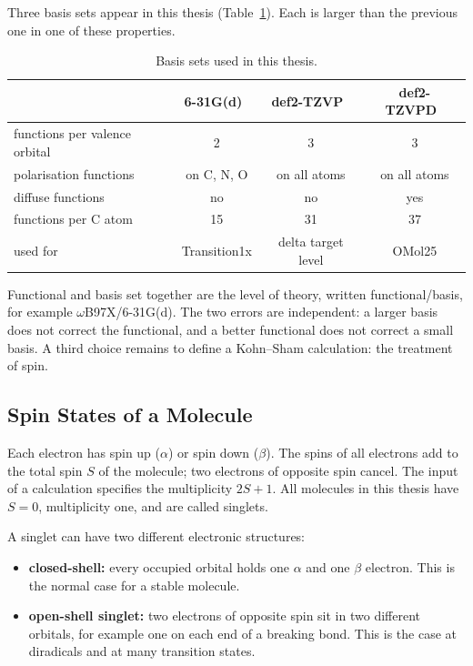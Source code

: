 Three basis sets appear in this thesis (Table~\ref{tab:basis}). Each is
larger than the previous one in one of these properties.

\begin{table}[h]
\centering
\caption{Basis sets used in this thesis.}
\label{tab:basis}
\begin{tabular}{@{}lccc@{}}
\toprule
 & 6-31G(d)~\cite{hariharan1973} & def2-TZVP~\cite{weigend2005} & def2-TZVPD~\cite{rappoport2010} \\
\midrule
functions per valence orbital & 2 & 3 & 3 \\
polarisation functions        & on C, N, O & on all atoms & on all atoms \\
diffuse functions             & no & no & yes \\
functions per C atom          & 15 & 31 & 37 \\
\midrule
used for & Transition1x & delta target level & OMol25 \\
\bottomrule
\end{tabular}
\end{table}

Functional and basis set together are the level of theory, written
functional/basis, for example \mbox{$\omega$B97X/6-31G(d)}. The two
errors are independent: a larger basis does not correct the functional,
and a better functional does not correct a small basis. A third choice
remains to define a Kohn--Sham calculation: the treatment of spin.



\subsection{Spin States of a Molecule}
\label{sec:background-spinstates}

Each electron has spin up ($\alpha$) or spin down ($\beta$). The spins of
all electrons add to the total spin $S$ of the molecule; two electrons of
opposite spin cancel. The input of a calculation specifies the
multiplicity $2S + 1$. All molecules in this thesis have $S = 0$,
multiplicity one, and are called singlets.

A singlet can have two different electronic structures:

\begin{itemize}
  \item \textbf{closed-shell:} every occupied orbital holds one $\alpha$
    and one $\beta$ electron. This is the normal case for a stable
    molecule.
  \item \textbf{open-shell singlet:} two electrons of opposite spin sit in
    two different orbitals, for example one on each end of a breaking
    bond. This is the case at diradicals and at many transition states.
\end{itemize}

